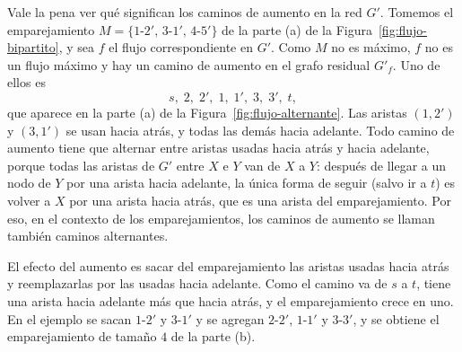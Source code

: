 \documentclass[12pt, spanish, oneside, openany]{book}
\theoremstyle{uprightplain}
\theoremstyle{definition}
\theoremstyle{remark}
\theoremstyle{definition}
\begin{document}
Vale la pena ver qué significan los caminos de aumento en la red $G'$. Tomemos el emparejamiento $M=\{1\text{-}2',\,3\text{-}1',\,4\text{-}5'\}$ de la parte (a) de la Figura~\ref{fig:flujo-bipartito}, y sea $f$ el flujo correspondiente en $G'$. Como $M$ no es máximo, $f$ no es un flujo máximo y hay un camino de aumento en el grafo residual $G'_f$. Uno de ellos es
\[
s,\;2,\;2',\;1,\;1',\;3,\;3',\;t,
\]
que aparece en la parte (a) de la Figura~\ref{fig:flujo-alternante}. Las aristas $(1,2')$ y $(3,1')$ se usan hacia atrás, y todas las demás hacia adelante. Todo camino de aumento tiene que alternar entre aristas usadas hacia atrás y hacia adelante, porque todas las aristas de $G'$ entre $X$ e $Y$ van de $X$ a $Y$: después de llegar a un nodo de $Y$ por una arista hacia adelante, la única forma de seguir (salvo ir a $t$) es volver a $X$ por una arista hacia atrás, que es una arista del emparejamiento. Por eso, en el contexto de los emparejamientos, los caminos de aumento se llaman también caminos alternantes.

El efecto del aumento es sacar del emparejamiento las aristas usadas hacia atrás y reemplazarlas por las usadas hacia adelante. Como el camino va de $s$ a $t$, tiene una arista hacia adelante más que hacia atrás, y el emparejamiento crece en uno. En el ejemplo se sacan $1\text{-}2'$ y $3\text{-}1'$ y se agregan $2\text{-}2'$, $1\text{-}1'$ y $3\text{-}3'$, y se obtiene el emparejamiento de tamaño $4$ de la parte (b).
\end{document}

